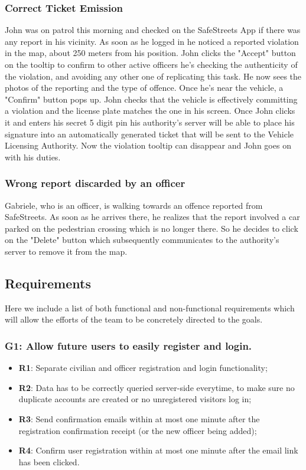 \documentclass[12pt,a4paper]{article}
\begin{document}
\subsubsection{Correct Ticket Emission}
John was on patrol this morning and checked on the SafeStreets App if there was any report in his vicinity. As soon as he logged in he noticed a reported violation in the map, about 250 meters from his position. John clicks the "Accept" button on the tooltip to confirm to other active officers he's checking the authenticity of the violation, and avoiding any other one of replicating this task. He now sees the photos of the reporting and the type of offence. Once he's near the vehicle, a "Confirm" button pops up. John checks that the vehicle is effectively committing a violation and the license plate matches the one in his screen. Once John clicks it and enters his secret 5 digit pin his authority's server will be able to place his signature into an automatically generated ticket that will be sent to the Vehicle Licensing Authority. Now the violation tooltip can disappear and John goes on with his duties.

\subsubsection{Wrong report discarded by an officer}
Gabriele, who is an officer, is walking towards an offence reported from SafeStreets. As soon as he arrives there, he realizes that the report involved a car parked on the pedestrian crossing which is no longer there. So he decides to click on the "Delete" button which subsequently communicates to the authority's server to remove it from the map.

\subsection{Requirements}
Here we include a list of both functional and non-functional requirements which will allow the efforts of the team to be concretely directed to the goals.
\subsubsection{G1: Allow future users to easily register and login.}
	
	\begin{itemize}
			\item \textbf{R1}: Separate civilian and officer registration and login functionality;
			\item \textbf{R2}: Data has to be correctly queried server-side everytime, to make sure no duplicate accounts are created or no unregistered visitors log in;
			\item \textbf{R3}: Send confirmation emails within at most one minute after the registration confirmation receipt (or the new officer being added); 
			\item \textbf{R4}: Confirm user registration within at most one minute after the email link has been clicked.
	\end{itemize}
	
\end{document}
